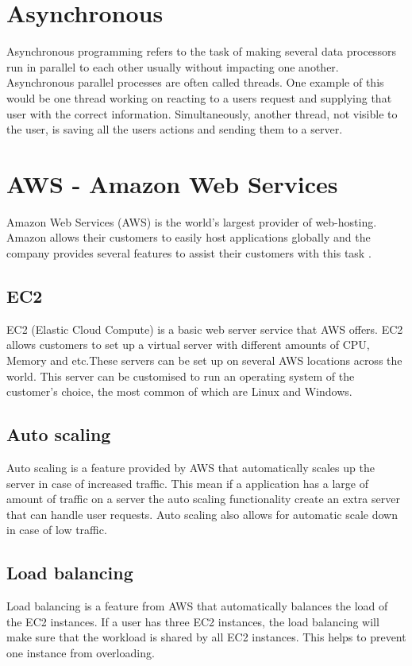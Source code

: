 \section{Asynchronous}
Asynchronous programming refers to the task of making several data processors run in parallel to each other usually without impacting one another. Asynchronous parallel processes are often called threads. One example of this would be one thread working on reacting to a users request and supplying that user with the correct information. Simultaneously, another thread, not visible to the user, is saving all the users actions and sending them to a server.

\section{AWS - Amazon Web Services}
Amazon Web Services (AWS) is the world's largest provider of web-hosting. Amazon allows their customers to easily host applications globally and the company provides several features to assist their customers with this task \cite{AWS}.
\subsection{EC2}
EC2 (Elastic Cloud Compute) is a basic web server service that AWS offers. EC2 allows customers to set up a virtual server with different amounts of CPU, Memory  and etc.These servers can be set up on several AWS locations across the world. This server can be customised to run an operating system of the customer's choice, the most common of which are Linux and Windows. \cite{AWSDoc}
\subsection{Auto scaling}
Auto scaling is a feature provided by AWS that automatically scales up the server in case of increased traffic. This mean if a application has a large of amount of traffic on a server the auto scaling functionality create an extra server  that can handle user requests. Auto scaling also allows for automatic scale down in case of low traffic. \cite{AWSDoc}
\subsection{Load balancing}
Load balancing is a feature from AWS that automatically balances the load of the EC2 instances. If a user has three EC2 instances, the load balancing will make sure that the workload is shared by all EC2 instances. This helps to prevent one instance from overloading. \cite{AWSDoc}
